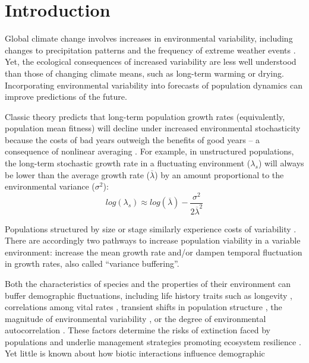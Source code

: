 \documentclass[lineno,Numbered]{sn-jnl}%
\begin{document}
	
	
	
	
	\section*{Introduction}
	Global climate change involves increases in environmental variability, including changes to precipitation patterns and the frequency of extreme weather events \cite{seneviratne2012changes, ipcc_2021}.
	Yet, the ecological consequences of increased variability are less well understood than those of changing climate means, such as long-term warming or drying. 
	Incorporating environmental variability into forecasts of population dynamics can improve predictions of the future.
	
	Classic theory predicts that long-term population growth rates (equivalently, population mean fitness) will decline under increased environmental stochasticity because the costs of bad years outweigh the benefits of good years -- a consequence of nonlinear averaging \cite{lewontin_population_1969,tuljapurkar_population_1982}.
	For example, in unstructured populations, the long-term stochastic growth rate in a fluctuating environment ($\lambda_s$) will always be lower than the average growth rate ($\overline{\lambda}$) by an amount proportional to the environmental variance ($\sigma^2$): 
	\begin{equation}
		log(\lambda_s)  \approx log(\overline{\lambda}) - \frac{\sigma^2}{2\overline{\lambda}^2}
	\end{equation}
	
	\noindent Populations structured by size or stage similarly experience costs of variability \cite{cohen1979comparative, tuljapurkar2013population}.
	There are accordingly two pathways to increase population viability in a variable environment: increase the mean growth rate and/or dampen temporal fluctuation in growth rates, also called ``variance buffering''.
	
	Both the characteristics of species and the properties of their environment can buffer demographic fluctuations, including life history traits such as longevity \cite{pfister1998patterns, morris2008longevity}, correlations among vital rates \cite{compagnoni2016effect}, transient shifts in population structure \cite{ellis2013role}, the magnitude of environmental variability \cite{rodriguez2021limits}, or the degree of environmental autocorrelation \cite{tuljapurkar1980population,fieberg2001stochastic}. 
	These factors determine the risks of extinction faced by populations \cite{menges2000applications} and underlie management strategies promoting ecosystem resilience \cite{kuparinen2016fishing}. 
	Yet little is known about how biotic interactions influence demographic
	
	
	\newpage
	
	
	
	
\end{document}
